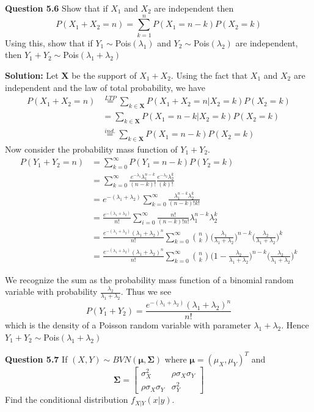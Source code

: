\documentclass[12pt]{article}  %
\begin{document}
\newpage

\textbf{Question 5.6} Show that if $X_1$ and $X_2$ are independent then $$P(X_1 + X_2 = n) = \sum_{k = 1}^{n}P(X_1 = n-k)P(X_2 =k)$$ Using this, show that if $Y_1\sim$Pois$(\lambda_1)$ and $Y_2\sim$Pois$(\lambda_2)$ are independent, then $Y_1 + Y_2\sim$Pois$(\lambda_1+\lambda_2)$

\textbf{Solution:} Let $\mathbf{X}$ be the support of $X_1 + X_2$. Using the fact that $X_1$ and $X_2$ are independent and the law of total probability, we have 
\begin{align*}
P(X_1 + X_2 = n) &\overset{LTP}{=} \sum_{k\in\mathbf{X}}P(X_1 + X_2 = n|X_2 = k)P(X_2 = k)\\
&= \sum_{k\in\mathbf{X}}P(X_1 = n - k|X_2 = k)P(X_2 = k)\\
&\overset{ind.}{=} \sum_{k\in\mathbf{X}}P(X_1 = n - k)P(X_2 = k)
\end{align*}
Now consider the probability mass function of $Y_1 + Y_2$. 
\begin{align*}
P(Y_1 + Y_2 = n) &= \sum_{k=0}^{\infty}P(Y_1 = n - k)P(Y_2 = k)\\
&= \sum_{k=0}^{\infty}\frac{e^{-\lambda_1}\lambda_1^{n-k}}{(n-k)!}\frac{e^{-\lambda_2}\lambda_2^{k}}{(k)!}\\
&= e^{-(\lambda_1 + \lambda_2)}\sum_{k=0}^{\infty}\frac{\lambda_1^{n-k}\lambda_2^{k}}{(n-k)!k!}\\
&= \frac{e^{-(\lambda_1 + \lambda_2)}}{n!}\sum_{i=0}^{\infty}\frac{n!}{(n-k)!n!}\lambda_1^{n-k}\lambda_2^{k}\\
&= \frac{e^{-(\lambda_1 + \lambda_2)}(\lambda_1+\lambda_2)^n}{n!}\sum_{k=0}^{\infty}\binom{n}{k}\big(\frac{\lambda_1}{\lambda_1 + \lambda_2}\big)^{n-k}(\frac{\lambda_2}{\lambda_1 + \lambda_2}\big)^{k}\\
&= \frac{e^{-(\lambda_1 + \lambda_2)}(\lambda_1+\lambda_2)^n}{n!}\sum_{k=0}^{\infty}\binom{n}{k}\big(1-\frac{\lambda_2}{\lambda_1 + \lambda_2}\big)^{n-k}(\frac{\lambda_2}{\lambda_1 + \lambda_2}\big)^{k}
\end{align*}

We recognize the sum as the probability mass function of a binomial random variable with probability $\frac{\lambda_2}{\lambda_1 + \lambda_2}$. Thus we see 
$$P(Y_1 + Y_2) = \frac{e^{-(\lambda_1 + \lambda_2)}(\lambda_1+\lambda_2)^n}{n!}$$
which is the density of a Poisson random variable with parameter $\lambda_1 + \lambda_2$. Hence $Y_1 + Y_2\sim$Pois$(\lambda_1 + \lambda_2)$
\newpage

\textbf{Question 5.7} If $(X,Y)\sim BVN(\mathbf{\mu}, \mathbf{\Sigma})$ where $\mathbf{\mu} = (\mu_X,\mu_Y)^{T}$ and \[\mathbf{\Sigma} = \begin{bmatrix}\sigma_X^2 & \rho\sigma_X\sigma_Y\\\rho\sigma_X\sigma_Y & \sigma_Y^2\end{bmatrix}\] Find the conditional distribution $f_{X|Y}(x|y)$. 
\end{document}
